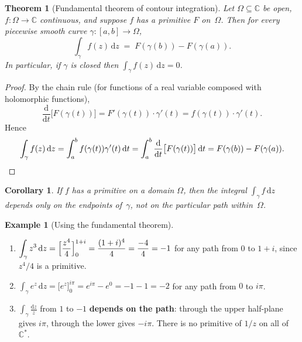 \documentclass[12pt,a4paper,openany]{book}
\theoremstyle{definition}
\newtheorem{example}[definition]{Example}
\theoremstyle{plain}
\newtheorem{theorem}[definition]{Theorem}
\newtheorem{corollary}[definition]{Corollary}
\theoremstyle{remark}
\newcommand{\C}{\mathbb{C}}
\newcommand{\dd}{\mathrm{d}}
\begin{document}
\begin{theorem}[Fundamental theorem of contour integration]%
\label{thm:fundamental-contour}
Let $\Omega\subseteq\C$ be open, $f\colon\Omega\to\C$ continuous, and suppose
$f$ has a primitive $F$ on~$\Omega$.  Then for every piecewise smooth curve
$\gamma\colon[a,b]\to\Omega$,
\begin{equation}\label{eq:FTC-complex}
  \int_\gamma f(z)\,\dd z \;=\; F(\gamma(b)) - F(\gamma(a)).
\end{equation}
In particular, if $\gamma$ is closed then $\int_\gamma f(z)\,\dd z = 0$.
\end{theorem}

\begin{proof}
By the chain rule (for functions of a real variable composed with holomorphic
functions),
\[
  \frac{\dd}{\dd t}\bigl[F(\gamma(t))\bigr]
  = F'(\gamma(t))\cdot\gamma'(t)
  = f(\gamma(t))\cdot\gamma'(t).
\]
Hence
\[
  \int_\gamma f(z)\,\dd z
  = \int_a^b f(\gamma(t))\gamma'(t)\,\dd t
  = \int_a^b \frac{\dd}{\dd t}\bigl[F(\gamma(t))\bigr]\,\dd t
  = F(\gamma(b))-F(\gamma(a)). \qedhere
\]
\end{proof}

\begin{corollary}\label{cor:primitive-path-independence}
If $f$ has a primitive on a domain $\Omega$, then the integral
$\int_\gamma f\,\dd z$ depends only on the endpoints of~$\gamma$, not on
the particular path within~$\Omega$.
\end{corollary}

\begin{example}[Using the fundamental theorem]\label{ex:FTC-application}
\leavevmode
\begin{enumerate}[label=\textup{(\alph*)}]
  \item $\displaystyle\int_\gamma z^3\,\dd z = \Bigl[\frac{z^4}{4}\Bigr]_0^{1+i}
    = \frac{(1+i)^4}{4} = \frac{-4}{4} = -1$
    for any path from $0$ to $1+i$, since $z^4/4$ is a primitive.
  \item $\displaystyle\int_\gamma e^z\,\dd z = \bigl[e^z\bigr]_0^{i\pi}
    = e^{i\pi}-e^0 = -1-1 = -2$
    for any path from $0$ to $i\pi$.
  \item $\displaystyle\int_\gamma\frac{\dd z}{z}$ from $1$ to $-1$
    \textbf{depends on the path}: through the upper half-plane gives $i\pi$,
    through the lower gives $-i\pi$.  There is no primitive of $1/z$ on
    all of $\C^*$.
\end{enumerate}
\end{example}
\end{document}
